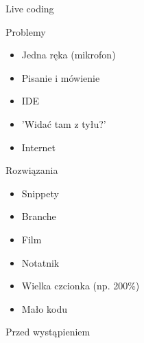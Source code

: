 \documentclass{beamer}
\begin{document}
\begin{frame}{}
	\begin{center}
		\Huge{Live coding}
	\end{center}
\end{frame}

\begin{frame}{}
	\begin{center}
		\Huge{Problemy}
	\end{center}
\end{frame}

\begin{frame}{}
	\begin{Large}
		\begin{itemize}[<+->]
			\item Jedna ręka (mikrofon)
			\item Pisanie i mówienie
			\item IDE
			\item 'Widać tam z tyłu?'
			\item Internet
		\end{itemize}
	\end{Large}
\end{frame}

\begin{frame}{}
	\begin{center}
		\Huge{Rozwiązania}
	\end{center}
\end{frame}

\begin{frame}{}
	\begin{Large}
		\begin{itemize}[<+->]
			\item Snippety
			\item Branche
			\item Film
			\item Notatnik
			\item Wielka czcionka (np. 200\%)
			\item Mało kodu
		\end{itemize}
	\end{Large}
\end{frame}

\begin{frame}{}
	\begin{center}
		\Huge{Przed wystąpieniem}
	\end{center}
\end{frame}
\end{document}
